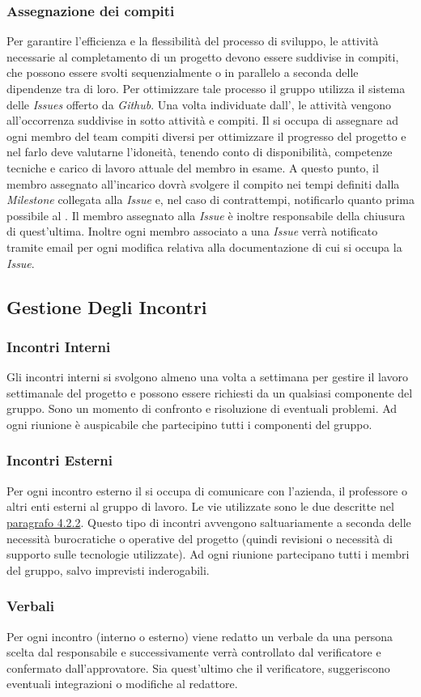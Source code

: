 	\subsubsection{Assegnazione dei compiti}
	Per garantire l'efficienza e la flessibilità del processo di sviluppo, le attività necessarie al completamento di un progetto devono essere suddivise in compiti, che possono essere svolti sequenzialmente o in parallelo a seconda delle dipendenze tra di loro. Per ottimizzare tale processo il gruppo utilizza il sistema delle \emph{Issues} offerto da \emph{Github}.	
	Una volta individuate dall'\Ana{}, le attività vengono all'occorrenza suddivise in sotto attività e compiti. Il \RdP{} si occupa di assegnare ad ogni membro del team compiti diversi per ottimizzare il progresso del progetto e nel farlo deve valutarne l'idoneità, tenendo conto di disponibilità, competenze tecniche e carico di lavoro attuale del membro in esame. A questo punto, il membro assegnato all'incarico dovrà svolgere il compito nei tempi definiti dalla \emph{Milestone} collegata alla \emph{Issue} e, nel caso di contrattempi, notificarlo quanto prima possibile al \RdP{}. Il membro assegnato alla \emph{Issue} è inoltre responsabile della chiusura di quest'ultima. Inoltre ogni membro associato a una \emph{Issue} verrà notificato tramite email per ogni modifica relativa alla documentazione %
	di cui si occupa la \emph{Issue}.

\subsection{Gestione Degli Incontri}
	\subsubsection{Incontri Interni}
	Gli incontri interni si svolgono almeno una volta a settimana per gestire il lavoro settimanale del progetto e possono essere richiesti da un qualsiasi componente del gruppo. Sono un momento di confronto e risoluzione di eventuali problemi. Ad ogni riunione è auspicabile che partecipino tutti i componenti del gruppo.
	\subsubsection{Incontri Esterni}
	Per ogni incontro esterno il \RdP{} si occupa di comunicare con l'azienda, il professore o altri enti esterni al gruppo di lavoro. 
	Le vie utilizzate sono le due descritte nel \hyperref[sec:Comunicazioni Esterne]{paragrafo 4.2.2}.
	Questo tipo di incontri avvengono saltuariamente a seconda delle necessità burocratiche o operative del progetto (quindi revisioni o necessità di supporto sulle tecnologie utilizzate).
	Ad ogni riunione partecipano tutti i membri del gruppo, salvo imprevisti inderogabili.
	\subsubsection{Verbali}
	Per ogni incontro (interno o esterno) viene redatto un verbale da una persona scelta dal responsabile e successivamente verrà controllato dal verificatore e confermato dall’approvatore. Sia quest'ultimo che il verificatore, suggeriscono eventuali integrazioni o modifiche al redattore.
	